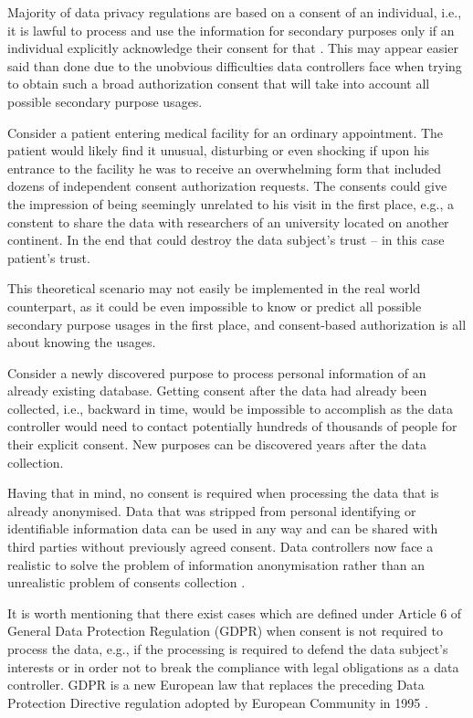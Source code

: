 \documentclass[a4paper,twoside,12pt]{book}
\begin{document}
Majority of data privacy regulations are based on a consent of an individual, i.e., it is lawful to process and use the information for secondary purposes only if an individual explicitly acknowledge their consent for that \cite{bib:gdpr_practical_guide}. This may appear easier said than done due to the unobvious difficulties data controllers face when trying to obtain such a broad authorization consent that will take into account all possible secondary purpose usages.

Consider a patient entering medical facility for an ordinary appointment. The patient would likely find it unusual, disturbing or even shocking if upon his entrance to the facility he was to receive an overwhelming form that included dozens of independent consent authorization requests. The consents could give the impression of being seemingly unrelated to his visit in the first place, e.g., a constent to share the data with researchers of an university located on another continent. In the end that could destroy the data subject's trust – in this case patient's trust.

This theoretical scenario may not easily be implemented in the real world counterpart, as it could be even impossible to know or predict all possible secondary purpose usages in the first place, and consent-based authorization is all about knowing the usages.

Consider a newly discovered purpose to process personal information of an already existing database. Getting consent after the data had already been collected, i.e., backward in time, would be impossible to accomplish as the data controller would need to contact potentially hundreds of thousands of people for their explicit consent. New purposes can be discovered years after the data collection.

Having that in mind, no consent is required when processing the data that is already anonymised. Data that was stripped from personal identifying or identifiable information data can be used in any way and can be shared with third parties without previously agreed consent. Data controllers now face a realistic to solve the problem of information anonymisation rather than an unrealistic problem of consents collection \cite{bib:anonymizing_health_data}.

It is worth mentioning that there exist cases which are defined under Article 6 of General Data Protection Regulation (GDPR) \cite{bib:art6} when consent is not required to process the data, e.g., if the processing is required to defend the data subject's interests or in order not to break the compliance with legal obligations as a data controller. GDPR is a new European law that replaces the preceding Data Protection Directive regulation adopted by European Community in 1995 \cite{bib:gdpr_practical_guide}. 
\end{document}

